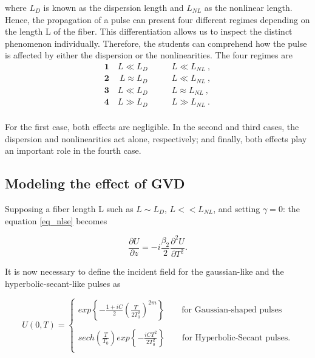         where $L_D$ is known as the dispersion length and $L_{NL}$ as the nonlinear length. Hence, the propagation of a pulse can present four different regimes depending on the length L of the fiber. This differentiation allows us to inspect the distinct phenomenon individually. Therefore, the students can comprehend how the pulse is affected by either the dispersion or the nonlinearities. The four regimes are 
        \begin{equation}
            \begin{aligned}\label{eq_lregimes}
               \mathbf{1} \quad L \ll L_D \quad & \quad L \ll  L_{NL} \ , \\
              \mathbf{2} \ \quad L \approx L_D \quad & \quad L \ll  L_{NL} \ , \\
               \mathbf{3} \quad L \ll L_D \quad & \quad L \approx  L_{NL} \ , \\
               \mathbf{4} \quad L \gg L_D \quad & \quad L \gg  L_{NL} \ . \\
            \end{aligned}
        \end{equation} 
        
        For the first case, both effects are negligible. In the second and third cases, the dispersion and nonlinearities act alone, respectively; and finally, both effects play an important role in the fourth case.
        
        \subsection{Modeling the effect of GVD}\label{subsect:gvd}
   
    
        
        Supposing a fiber length L such as $L \sim L_D$, $L << L_{NL}$, and setting $\gamma = 0$:  the equation \eqref{eq_nlse} becomes 
        
         \begin{equation}\label{eq_ugvd}
            \frac{\partial U}{\partial z} = -i\frac{\beta_2}{2}\frac{\partial^2U}{\partial T^2}.
        \end{equation}

        It is now necessary to define the incident field for the gaussian-like and the hyperbolic-secant-like pulses as 
            
        \begin{equation}\label{eq_u0t}
            U(0,T) = 
            \begin{cases}
                exp \left\{ -\frac{1+iC}{2} \left(\frac{T}{2T^2_0} \right)^{2m} \right\} \qquad \text{for Gaussian-shaped pulses}  \\
                \ \\
                sech\left( \frac{T}{T_0}\right) exp \left\{ -\frac{iCT^2}{2T^2_0} \right\} \qquad \text{for Hyperbolic-Secant pulses}.  \\
            \end{cases}
        \end{equation}
        
